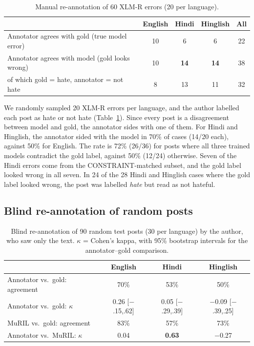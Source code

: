 \documentclass[11pt,a4paper]{article}
\begin{document}
\begin{table}[h]
\centering
\small
\begin{tabular}{lcccc}
\toprule
 & English & Hindi & Hinglish & All \\
\midrule
Annotator agrees with gold (true model error) & 10 & 6 & 6 & 22 \\
Annotator agrees with model (gold looks wrong) & 10 & \textbf{14} & \textbf{14} & 38 \\
\quad of which gold = hate, annotator = not hate & 8 & 13 & 11 & 32 \\
\bottomrule
\end{tabular}
\caption{Manual re-annotation of 60 XLM-R errors (20 per language).}
\label{tab:manual}
\end{table}

We randomly sampled 20 XLM-R errors per language, and the author labelled each post as hate or not hate (Table~\ref{tab:manual}).
Since every post is a disagreement between model and gold, the annotator sides with one of them.
For Hindi and Hinglish, the annotator sided with the model in 70\% of cases (14/20 each), against 50\% for English.
The rate is 72\% (26/36) for posts where all three trained models contradict the gold label, against 50\% (12/24) otherwise.
Seven of the Hindi errors come from the CONSTRAINT-matched subset, and the gold label looked wrong in all seven.
In 24 of the 28 Hindi and Hinglish cases where the gold label looked wrong, the post was labelled \emph{hate} but read as not hateful.

\subsection{Blind re-annotation of random posts}

\begin{table}[h]
\centering
\small
\begin{tabular}{lccc}
\toprule
 & English & Hindi & Hinglish \\
\midrule
Annotator vs.\ gold: agreement & 70\% & 53\% & 50\% \\
Annotator vs.\ gold: $\kappa$ & 0.26 {\scriptsize[$-$.15,.62]} & 0.05 {\scriptsize[$-$.29,.39]} & $-$0.09 {\scriptsize[$-$.39,.25]} \\
MuRIL vs.\ gold: agreement & 83\% & 57\% & 73\% \\
Annotator vs.\ MuRIL: $\kappa$ & 0.04 & \textbf{0.63} & $-$0.27 \\
\bottomrule
\end{tabular}
\caption{Blind re-annotation of 90 random test posts (30 per language) by the author, who saw only the text. $\kappa$ = Cohen's kappa, with 95\% bootstrap intervals for the annotator--gold comparison.}
\label{tab:blind}
\end{table}
\end{document}

